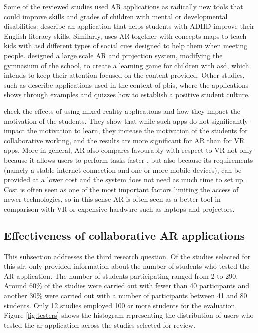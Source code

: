 Some of the reviewed studies used AR applications as radically new tools that could improve skills and grades of children with mental or developmental disabilities: \cite{luna2018words} describe an application that helps students with \gls{ADHD} improve their English literacy skills. Similarly, \cite{chen2019effects} uses AR together with concepts maps to teach kids with \gls{asd} different types of social cues designed to help them when meeting people. \cite{takahashi2018empathic} designed a large scale AR and projection system, modifying the gymnasium of the school, to create a learning game for children with \gls{asd}, which intends to keep their attention focused on the content provided. Other studies, such as \cite{dominguez2022collaborative, farella2021augmented, farella2022arete} describe applications used in the context of \gls{pbis}, where the applications shows through examples and quizzes how to establish a positive student culture.

\cite{258-beyoglu2020use} check the effects of using mixed reality applications and how they impact the motivation of the students. They show that while such apps do not significantly impact the motivation to learn, they increase the motivation of the students for collaborative working, and the results are more significant for AR than for \gls{VR} apps. More in general, AR also compares favourably with respect to \gls{VR} not only because it allows users to perform tasks faster \citep{7833028}, but also because its requirements (namely a stable internet connection and one or more mobile devices), can be provided at a lower cost and the system does not need as much time to set up. Cost is often seen as one of the most important factors limiting the access of newer technologies, so in this sense AR is often seen as a better tool in comparison with VR or expensive hardware such as laptops and projectors.

\subsection{Effectiveness of collaborative AR applications}

This subsection addresses the third research question. Of the \papersSelected studies selected for this \gls{slr}, only \papersWithNumStudentInfo provided information about the number of students who tested the AR application. The number of students participating ranged from 2 to 290. Around 60\% of the studies were carried out with fewer than 40 participants and another 30\% were carried out with a number of participants between 41 and 80 students. Only 12 studies employed 100 or more students for the evaluation. Figure \ref{fig:testers} shows the histogram representing the distribution of users who tested the \gls{ar} application across the studies selected for review.

